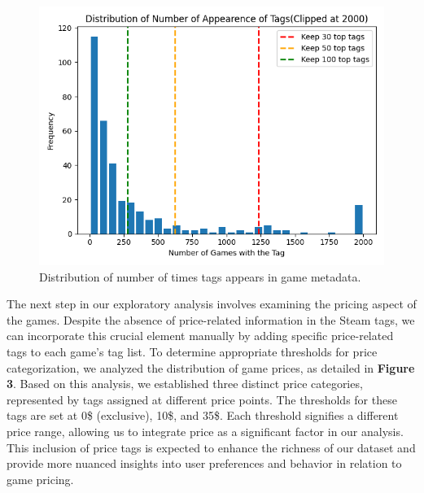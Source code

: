\documentclass[sigplan,screen]{acmart}
\begin{document}
\begin{figure}[h]
  \centering
  \includegraphics[width=\linewidth]{tag_appearnce_hist.png}
  \caption{Distribution of number of times tags appears in game metadata.}
\end{figure}

The next step in our exploratory analysis involves examining the pricing aspect of the games. Despite the absence of price-related information in the Steam tags, we can incorporate this crucial element manually by adding specific price-related tags to each game's tag list. To determine appropriate thresholds for price categorization, we analyzed the distribution of game prices, as detailed in \textbf{Figure 3}. Based on this analysis, we established three distinct price categories, represented by tags assigned at different price points. The thresholds for these tags are set at 0\$ (exclusive), 10\$, and 35\$. Each threshold signifies a different price range, allowing us to integrate price as a significant factor in our analysis. This inclusion of price tags is expected to enhance the richness of our dataset and provide more nuanced insights into user preferences and behavior in relation to game pricing.
\end{document}
